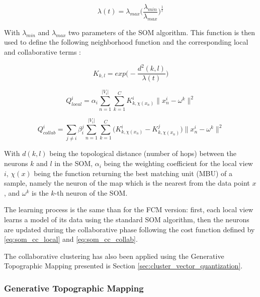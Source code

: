 \documentclass[a4paper]{report}
\begin{document}
    \begin{equation}
        \lambda(t) = \lambda_{max}\Big(\frac{\lambda_{min}}{\lambda_{max}}\Big)^{\frac{1}{t}}
        \label{eq:som_temp}
    \end{equation}

    With $\lambda_{min}$ and $\lambda_{max}$ two parameters of the SOM algorithm. This function is then used to define the following neighborhood function and the corresponding local and collaborative terms :

    \begin{equation}
        K_{k,l} = exp\Big(-\frac{d^2(k,l)}{\lambda(t)}\Big)
        \label{eq:som_neigh}
    \end{equation}

    \begin{equation}
        Q_{local}^i = \alpha_i \sum_{n=1}^{|V_i|}\sum_{k=1}^C K^i_{k,\chi(x_n)}\|x_n^i - \omega^k \|^2 
        \label{eq:som_cc_local}
    \end{equation}

    \begin{equation}
    Q_{collab}^i = \sum_{j \neq i}\beta_i^j \sum_{n=1}^{|V_i|}\sum_{k=1}^C \big(K^i_{k,\chi(x_n)} - K^j_{k,\chi(x_n)}\big)\|x_n^i - \omega^k \|^2 
        \label{eq:som_cc_collab}
    \end{equation}

    With $d(k,l)$ being the topological distance (number of hops) between the neurons $k$ and $l$ in the SOM, $\alpha_i$ being the weighting coefficient for the local view $i$, $\chi(x)$ being the function returning the best matching unit (MBU) of a sample, namely the neuron of the map which is the nearest from the data point $x$, and $\omega^k$ is the $k$-th neuron of the SOM.

    The learning process is the same than for the FCM version: first, each local view learns a model of its data using the standard SOM algorithm, then the neurons are updated during the collaborative phase following the cost function defined by \ref{eq:som_cc_local} and \ref{eq:som_cc_collab}.

    The collaborative clustering has also been applied using the Generative Topographic Mapping \cite{bishop1998gtm} presented is Section \ref{sec:cluster_vector_quantization}.

    \subsubsection{Generative Topographic Mapping}
\end{document}
